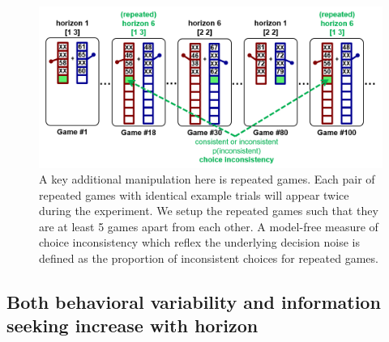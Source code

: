 \documentclass[12pt]{article}
\begin{document}
	\begin{figure}[h]
		\begin{center}
			\includegraphics[width=\textwidth]{figures/taskfig.PNG}
			\caption{A key additional manipulation here is repeated games. Each pair of repeated games with identical example trials will appear twice during the experiment. We setup the repeated games such that they are at least 5 games apart from each other. A model-free measure of choice inconsistency which reflex the underlying decision noise is defined as the proportion of inconsistent choices for repeated games.}
			\label{fig:taskfig}
		\end{center}
	\end{figure}
	
	\subsection*{Both behavioral variability and information seeking increase with horizon}
	
	
	
	
\end{document}
